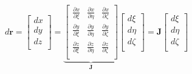 \documentclass
[
a4paper,                      %
twoside,					  %
12pt,                         %
abstract,		      %
fleqn,                        %
]
{scrartcl} %
\begin{document}
\begin{description}
\begin{equation}
d\mathbf{r}=\begin{bmatrix}
dx\\
dy\\
dz\\
\end{bmatrix}=\underbrace{\begin{bmatrix}
\frac{\partial x}{\partial\xi}&\frac{\partial x}{\partial\eta}&\frac{\partial x}{\partial\zeta}\\
\frac{\partial y}{\partial\xi}&\frac{\partial y}{\partial\eta}&\frac{\partial y}{\partial\zeta}\\
\frac{\partial z}{\partial\xi}&\frac{\partial z}{\partial\eta}&\frac{\partial z}{\partial\zeta}\\
\end{bmatrix}}_{\mathbf{J}}\begin{bmatrix}
d\xi\\
d\eta\\
d\zeta\\
\end{bmatrix}=\mathbf{J}\begin{bmatrix}
d\xi\\
d\eta\\
d\zeta\\
\end{bmatrix}
\end{equation}



\end{description}
\end{document}
